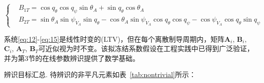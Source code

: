 \begin{equation}
\label{eq:15}
\left\{
\begin{aligned}
& {B_{1T}} = \cos {q_\theta }\cos {q_\psi }\sin {\theta _A} + \sin {q_\theta }\cos {\theta _A} \\
& {B_{2T}} = \sin {\theta _A}\sin {\psi _{{V_A}}}\sin {q_\theta } - \cos {\theta _A}\sin {\psi _{{V_A}}}\cos {q_\theta }\cos {q_\psi } - \cos {\psi _{{V_A}}}\cos {q_\theta }\sin {q_\psi }
\end{aligned}
\right.
\end{equation}
\begin{remark}
系统\eqref{eq:12}-\eqref{eq:15}是线性时变的(LTV)，但在每个离散制导周期内，矩阵${{\mathbf{A}}_i}$, ${{\mathbf{B}}_i}$, ${{\mathbf{C}}_i}$, ${{\mathbf{A}}_T}$, ${{\mathbf{B}}_T}$可近似视为时不变。该拟冻结系数假设在工程实践中已得到广泛验证，并为第3节的在线参数辨识提供了数学基础。
\end{remark}
辨识目标汇总. 待辨识的非平凡元素如表~\ref{tab:nontrivial}所示：


